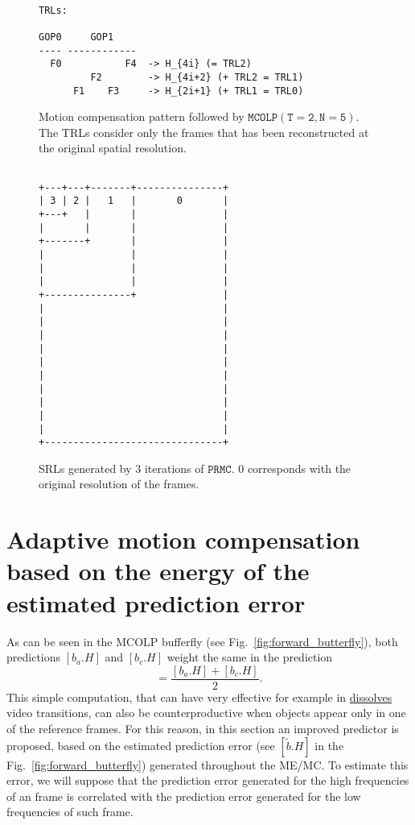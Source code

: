 \begin{figure}
\begin{verbatim}

TRLs:

GOP0     GOP1
---- ------------
  F0           F4  -> H_{4i} (= TRL2)
         F2        -> H_{4i+2} (+ TRL2 = TRL1)
      F1    F3     -> H_{2i+1} (+ TRL1 = TRL0)
\end{verbatim}
  \caption{Motion compensation pattern followed by $\mathtt{MCOLP(T=2,
      N=5)}$. The TRLs consider only the frames that has been
    reconstructed at the original spatial resolution.}
  \label{fig:PRMC_2_5_T}
\end{figure}

\begin{figure}
\begin{verbatim}

+---+---+-------+---------------+
| 3 | 2 |   1   |       0       |
+---+   |       |               |
|       |       |               |
+-------+       |               |
|               |               |
|               |               |
|               |               |
+---------------+               |
|                               |
|                               |
|                               |
|                               |
|                               |
|                               |
|                               |
|                               |
|                               |
|                               |
+-------------------------------+
\end{verbatim}
\caption{SRLs generated by $3$ iterations of $\mathtt{PRMC}$. $0$
    corresponds with the original resolution of the frames.}
  \label{fig:PRMC_2_5_S}
\end{figure}


\section{Adaptive motion compensation based on the energy of the estimated prediction error}

As can be seen in the MCOLP bufferfly (see
Fig.~\ref{fig:forward_butterfly}), both predictions $[b_a.H]$ and
$[b_c.H]$ weight the same in the prediction
\begin{equation}
  [\hat{b.H}] = \frac{[b_a.H] + [b_c.H]}{2}.
\end{equation}
This simple computation, that can have very effective for example in
\href{https://biteable.com/blog/tips/video-transitions-effects-examples/}{dissolves}
video transitions, can also be counterproductive when objects appear
only in one of the reference frames. For this reason, in this section
an improved predictor is proposed, based on the estimated prediction
error (see $[\tilde{b}.H]$ in the Fig.~\ref{fig:forward_butterfly})
generated throughout the ME/MC. To estimate this error, we will
suppose that the prediction error generated for the high frequencies
of an frame is correlated with the prediction error generated for the
low frequencies of such frame.

